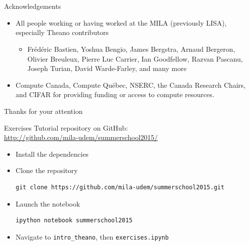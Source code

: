 \documentclass[a4paper,9pt]{beamer}
\begin{document}
\section{}

\begin{frame}{Acknowledgements}
  \begin{itemize}
    \item All people working or having worked at the MILA (previously LISA), especially Theano contributors
      \begin{itemize}
        \item
          Frédéric Bastien,
          Yoshua Bengio,
          James Bergstra,
          Arnaud Bergeron,
          Olivier Breuleux,
          Pierre Luc Carrier,
          Ian Goodfellow,
          Razvan Pascanu,
          Joseph Turian,
          David Warde-Farley,
          and many more
      \end{itemize}
    \item Compute Canada, Compute Québec, NSERC, the Canada Research Chairs, and CIFAR for providing funding or access to compute resources.
  \end{itemize}
\end{frame}

\begin{frame}[fragile]{Thanks for your attention}
    \vspace{1cm}

\end{frame}

\begin{frame}[fragile]{Exercises}
  Tutorial repository on GitHub:\\
  \url{http://github.com/mila-udem/summerschool2015/}

  \begin{itemize}
    \item Install the dependencies
    \item Clone the repository
      \begin{verbatim}
git clone https://github.com/mila-udem/summerschool2015.git
      \end{verbatim}
    \item Launch the notebook
      \begin{verbatim}
ipython notebook summerschool2015
      \end{verbatim}
    \item Navigate to {\tt intro\_theano}, then {\tt exercises.ipynb}
  \end{itemize}
\end{frame}
\end{document}
